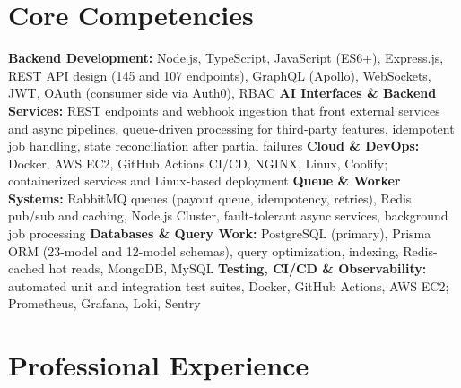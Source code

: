\documentclass[11pt,a4paper,sans]{moderncv}
\begin{document}
\section{Core Competencies}
\vspace{1pt}
\raggedright
\textbf{Backend Development:} Node.js, TypeScript, JavaScript (ES6+), Express.js, REST API design (145 and 107 endpoints), GraphQL (Apollo), WebSockets, JWT, OAuth (consumer side via Auth0), RBAC \textbar{}\textbf{AI Interfaces \& Backend Services:} REST endpoints and webhook ingestion that front external services and async pipelines, queue-driven processing for third-party features, idempotent job handling, state reconciliation after partial failures \textbar{}\textbf{Cloud \& DevOps:} Docker, AWS EC2, GitHub Actions CI/CD, NGINX, Linux, Coolify; containerized services and Linux-based deployment \textbar{}
\textbf{Queue \& Worker Systems:} RabbitMQ queues (payout queue, idempotency, retries), Redis pub/sub and caching, Node.js Cluster, fault-tolerant async services, background job processing \textbar{}
\textbf{Databases \& Query Work:} PostgreSQL (primary), Prisma ORM (23-model and 12-model schemas), query optimization, indexing, Redis-cached hot reads, MongoDB, MySQL \textbar{}
\textbf{Testing, CI/CD \& Observability:} automated unit and integration test suites, Docker, GitHub Actions, AWS EC2; Prometheus, Grafana, Loki, Sentry
\par\normalfont

\enlargethispage{4\baselineskip}
\section{Professional Experience}
\vspace{3pt}
\end{document}
